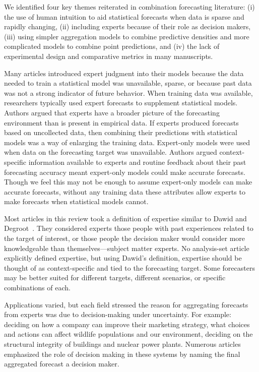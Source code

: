 \documentclass[preprint,authoryear]{elsarticle}
\begin{document}
We identified four key themes reiterated in combination forecasting literature: (i) the use of human intuition to aid statistical forecasts when data is sparse and rapidly changing, (ii) including experts because of their role as decision makers, (iii) using simpler aggregation models to combine predictive densities and more complicated models to combine point predictions, and (iv) the lack of experimental design and comparative metrics in many manuscripts.

Many articles introduced expert judgment into their models because the data needed to train a statistical model was unavailable, sparse, or because past data was not a strong indicator of future behavior.
When training data was available, researchers typically used expert forecasts to supplement statistical models.
Authors argued that experts have a broader picture of the forecasting environment than is present in empirical data. 
If experts produced forecasts based on uncollected data, then combining their predictions with statistical models was a way of enlarging the training data. 
Expert-only models were used when data on the forecasting target was unavailable.
Authors argued context-specific information available to experts and routine feedback about their past forecasting accuracy meant expert-only models could make accurate forecasts.
Though we feel this may not be enough to assume expert-only models can make accurate forecasts, without any training data these attributes allow experts to make forecasts when statistical models cannot.

Most articles in this review took a definition of expertise similar to Dawid and Degroot~\cite{dawid1995coherent}.
They considered experts those people with past experiences related to the target of interest, or those people the decision maker would consider more knowledgeable than themselves---subject matter experts.
No analysis-set article explicitly defined expertise, but using Dawid's definition, expertise should be thought of as context-specific and tied to the forecasting target.
Some forecasters may be better suited for different targets, different scenarios, or specific combinations of each.

Applications varied, but each field stressed the reason for aggregating forecasts from experts was due to decision-making under uncertainty. 
For example: deciding on how a company can improve their marketing strategy, what choices and actions can affect wildlife populations and our environment, deciding on the structural integrity of buildings and nuclear power plants.
Numerous articles emphasized the role of decision making in these systems by naming the final aggregated forecast a decision maker.
\end{document}
